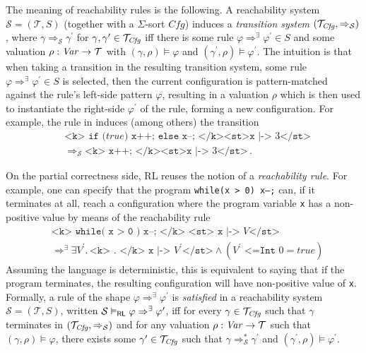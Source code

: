 The meaning of reachability rules is the following.
A reachability system $\mathcal{S} = (\mathcal{T}, S)$ (together with a $\Sigma$-sort $\mathit{Cfg}$)
induces
a \emph{transition system}
$(\mathcal{T}_{\mathit{Cfg}} , \Rightarrow_{\mathcal{S}})$,
where $\gamma \Rightarrow_{\mathcal{S}} \gamma^\prime$
for $\gamma, \gamma^\prime \in \mathcal{T}_{\mathit{Cfg}}$
iff there is some rule $\varphi \Rightarrow^\exists \varphi^\prime \in S$
and some valuation $\rho : \mathit{Var} \to \mathcal{T}$ with $(\gamma, \rho) \vDash \varphi$
and $(\gamma^\prime , \rho) \vDash \varphi^\prime$.
The intuition is that when taking a transition in the resulting transition system,
some rule $\varphi \Rightarrow^\exists \varphi^\prime \in S$ is selected,
then the current configuration is pattern-matched against the rule's left-side pattern $\varphi$,
resulting in a valuation $\rho$ which is then used to instantiate the right-side $\varphi^\prime$ of the rule,
forming a new configuration.
For example, the rule in  induces (among others) the transition
\begin{equation}\label{eqn:ruleIfTrue}
    \begin{aligned}
    & \texttt{<k> if (} \mathit{true} \texttt{) x++; else x--; </k><st>x} \texttt{ |-> } 3\texttt{</st>} \\
    & \Rightarrow_{\mathcal{S}} \texttt{<k> x++; </k><st>x} \texttt{ |-> } 3\texttt{</st>} \, .
    \end{aligned}
\end{equation}

On the partial correctness side, RL reuses the notion of a \emph{reachability rule}.
For example, one can specify that the program \texttt{while(x > 0) x--;}
can, if it terminates at all, reach a configuration
where the program variable \texttt{x} has a non-positive value
by means of the reachability rule
\begin{equation*}
    \begin{aligned}
        & \texttt{<k> while( x > 0 ) x--; </k> <st> x |-> } V \texttt{</st>} \\
        & \Rightarrow^\exists \exists V^\prime.\, \texttt{<k> . </k> x |-> } V^\prime \texttt{</st>} \land (V^\prime \texttt{ <=Int } 0 = \mathit{true})
    \end{aligned}
\end{equation*}
Assuming the language is deterministic, this is equivalent to saying that if the program terminates,
the resulting configuration will have non-positive value of \texttt{x}.
Formally, a rule of the shape $\varphi \Rightarrow^\exists \varphi^\prime$
is \emph{satisfied}
in a reachability system $\mathcal{S} = (\mathcal{T}, S)$,
written $\mathcal{S} \vDash_{\mathsf{RL}} \varphi \Rightarrow^\exists \varphi^\prime$,
iff for every $\gamma \in \mathcal{T}_{\mathit{Cfg}}$
such that $\gamma$ terminates in $(\mathcal{T}_{\mathit{Cfg}}, \Rightarrow_{\mathcal{S}})$
and for any valuation $\rho : \mathit{Var} \to \mathcal{T}$
such that $(\gamma, \rho) \vDash \varphi$,
there exists some $\gamma^\prime \in \mathcal{T}_{\mathit{Cfg}}$
such that
$\gamma \Rightarrow^{*}_{\mathcal{S}} \gamma^\prime$
and $(\gamma^\prime, \rho) \vDash \varphi^\prime$.


